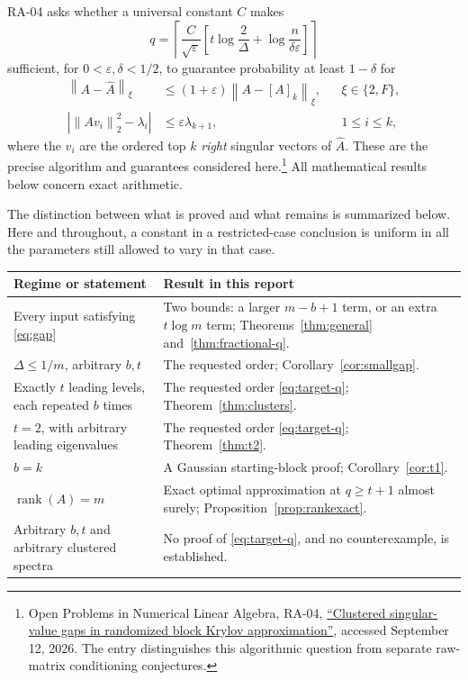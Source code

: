 \documentclass[11pt]{article}
\theoremstyle{definition}
\newcommand{\rank}{\operatorname{rank}}
\newcommand{\norm}[1]{\left\lVert #1\right\rVert}
\newcommand{\abs}[1]{\left\lvert #1\right\rvert}
\begin{document}
RA-04 asks whether a universal constant $C$ makes
\begin{equation}
 q=\left\lceil \frac{C}{\sqrt\varepsilon}
 \left[t\log\frac2\Delta+\log\frac{n}{\delta\varepsilon}\right]
 \right\rceil
 \label{eq:target-q}
\end{equation}
sufficient, for $0<\varepsilon,\delta<1/2$, to guarantee probability at least
$1-\delta$ for
\begin{align}
 \norm{A-\widehat A}_\xi
 &\leq (1+\varepsilon)\norm{A-[A]_k}_\xi,
 &&\xi\in\{2,F\},\label{eq:approx-target}\\
 \abs{\norm{Av_i}_2^2-\lambda_i}
 &\leq\varepsilon\lambda_{k+1},
 &&1\leq i\leq k,\label{eq:pca-target}
\end{align}
where the $v_i$ are the ordered top $k$ \emph{right} singular vectors of
$\widehat A$. These are the precise algorithm and guarantees considered
here.\footnote{Open Problems in Numerical Linear Algebra, RA-04,
\href{https://github.com/ajt60gaibb/OpenProblemsInNLA/tree/main/randomized-and-low-rank-approximation/RA-04}{``Clustered singular-value gaps in randomized block Krylov approximation''},
accessed September 12, 2026. The entry distinguishes this algorithmic question
from separate raw-matrix conditioning conjectures.}
All mathematical results below concern exact arithmetic.

The distinction between what is proved and what remains is summarized below.
Here and throughout, a constant in a restricted-case conclusion is uniform
in all the parameters still allowed to vary in that case.

\begin{center}
\small
\begin{tabular}{p{}p{}}
\toprule
Regime or statement & Result in this report\\
\midrule
Every input satisfying \eqref{eq:gap} & Two bounds: a larger $m-b+1$ term,
or an extra $t\log m$ term; Theorems~\ref{thm:general} and~\ref{thm:fractional-q}.\\[2pt]
$\Delta\leq1/m$, arbitrary $b,t$ & The requested order;
Corollary~\ref{cor:smallgap}.\\[2pt]
Exactly $t$ leading levels, each repeated $b$ times & The requested order
\eqref{eq:target-q}; Theorem~\ref{thm:clusters}.\\[2pt]
$t=2$, with arbitrary leading eigenvalues & The requested order
\eqref{eq:target-q}; Theorem~\ref{thm:t2}.\\[2pt]
$b=k$ & A Gaussian starting-block proof; Corollary~\ref{cor:t1}.\\[2pt]
$\rank(A)=m$ & Exact optimal approximation at $q\geq t+1$ almost surely;
Proposition~\ref{prop:rankexact}.\\[2pt]
Arbitrary $b,t$ and arbitrary clustered spectra & No proof of
\eqref{eq:target-q}, and no counterexample, is established.\\
\bottomrule
\end{tabular}
\end{center}
\end{document}
